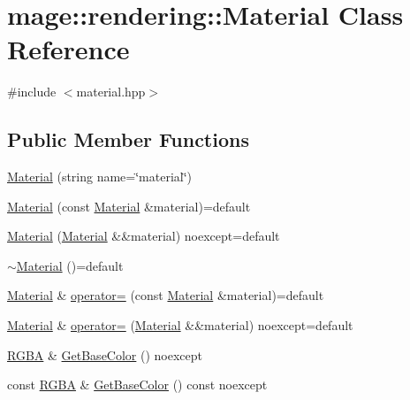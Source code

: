\hypertarget{classmage_1_1rendering_1_1_material}{}\section{mage\+:\+:rendering\+:\+:Material Class Reference}
\label{classmage_1_1rendering_1_1_material}


{\ttfamily \#include $<$material.\+hpp$>$}

\subsection*{Public Member Functions}
\begin{DoxyCompactItemize}
\item 
\mbox{\hyperlink{classmage_1_1rendering_1_1_material_a0d23055b62f54a28c77010412099a446}{Material}} (string name=\char`\"{}material\char`\"{})
\item 
\mbox{\hyperlink{classmage_1_1rendering_1_1_material_ac7cffca59fe250f10c2e68a875a03e91}{Material}} (const \mbox{\hyperlink{classmage_1_1rendering_1_1_material}{Material}} \&material)=default
\item 
\mbox{\hyperlink{classmage_1_1rendering_1_1_material_a52f4b3b0849b96306ea79c746070c6ba}{Material}} (\mbox{\hyperlink{classmage_1_1rendering_1_1_material}{Material}} \&\&material) noexcept=default
\item 
\mbox{\hyperlink{classmage_1_1rendering_1_1_material_a0dcdba799e013b2a8ff0108b14b9a73c}{$\sim$\+Material}} ()=default
\item 
\mbox{\hyperlink{classmage_1_1rendering_1_1_material}{Material}} \& \mbox{\hyperlink{classmage_1_1rendering_1_1_material_a535022bb3c1264412278337fc3d5d717}{operator=}} (const \mbox{\hyperlink{classmage_1_1rendering_1_1_material}{Material}} \&material)=default
\item 
\mbox{\hyperlink{classmage_1_1rendering_1_1_material}{Material}} \& \mbox{\hyperlink{classmage_1_1rendering_1_1_material_a2f90e0eeb8283da70db48fc1618aed10}{operator=}} (\mbox{\hyperlink{classmage_1_1rendering_1_1_material}{Material}} \&\&material) noexcept=default
\item 
\mbox{\hyperlink{structmage_1_1_r_g_b_a}{R\+G\+BA}} \& \mbox{\hyperlink{classmage_1_1rendering_1_1_material_a9dd92f97dbae7cfbdae55759c20f6887}{Get\+Base\+Color}} () noexcept
\item 
const \mbox{\hyperlink{structmage_1_1_r_g_b_a}{R\+G\+BA}} \& \mbox{\hyperlink{classmage_1_1rendering_1_1_material_aa98da3297c5043b9107638c877382bd8}{Get\+Base\+Color}} () const noexcept

\end{DoxyCompactItemize}
